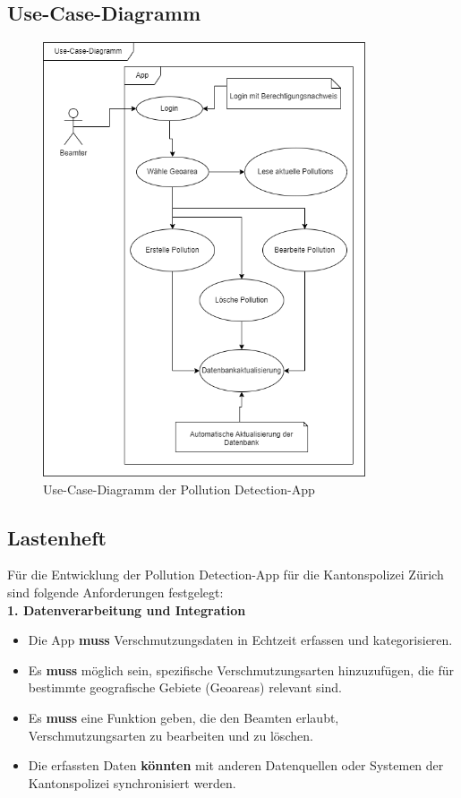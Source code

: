 \documentclass[a4paper,12pt]{article}
\begin{document}
\clearpage
\subsection{Use-Case-Diagramm}
\label{sec:use-case-diagramm}

\begin{figure}[h]
\centering
\includegraphics[width=0.85\textwidth]{bilder/use-case-diagramm.drawio.png}
\caption{Use-Case-Diagramm der \glqq Pollution Detection\grqq{}-App}
\end{figure}

\clearpage
\subsection{Lastenheft}
\label{sec:lastenheft}

Für die Entwicklung der \glqq Pollution Detection\grqq{}-App für die Kantonspolizei Zürich sind folgende Anforderungen festgelegt:\\

\noindent\textbf{1. Datenverarbeitung und Integration}

\begin{itemize}
    \item Die App \textbf{muss} Verschmutzungsdaten in Echtzeit erfassen und kategorisieren.
    \item Es \textbf{muss} möglich sein, spezifische Verschmutzungsarten hinzuzufügen, die für bestimmte geografische Gebiete (Geoareas) relevant sind.
    \item Es \textbf{muss} eine Funktion geben, die den Beamten erlaubt, Verschmutzungsarten zu bearbeiten und zu löschen.
    \item Die erfassten Daten \textbf{könnten} mit anderen Datenquellen oder Systemen der Kantonspolizei synchronisiert werden.
\end{itemize}
\end{document}
